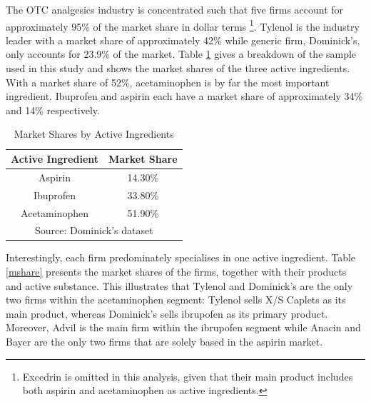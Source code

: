 \documentclass[12pt, authoryear]{elsarticle}
\begin{document}
The OTC analgesics industry is concentrated such that five firms account for approximately 95\% of the market share in dollar terms \footnote{Excedrin is omitted in this analysis, given that their main product includes both aspirin and
acetaminophen as active ingredients.}. Tylenol is the industry leader with a market share of approximately 42\% while generic firm, Dominick's, only accounts for 23.9\% of the market. Table \ref{active_share} gives a  breakdown of the sample used in this study and shows the market shares of the three active ingredients. With a market share of 52\%, acetaminophen is by far the most important ingredient. Ibuprofen and aspirin each have a market share of approximately 34\% and 14\% respectively.

\begin{table}[H]
	\caption{Market Shares by Active Ingredients}
	\label{active_share}
	\begin{tabular}{cc} \hline  \hline
		\textbf{Active Ingredient}  \cellcolor{gray!25} & \textbf{Market Share}  \cellcolor{gray!25} \\ \hline
		Aspirin & 14.30\% \\
		Ibuprofen & 33.80\% \\
		Acetaminophen & 51.90\% \\ \hline \hline
		\multicolumn{2}{c}{Source: Dominick's dataset}     
	\end{tabular}
\end{table}

Interestingly, each firm predominately specialises in one active ingredient. Table \ref{mshare}  presents the market shares of the firms, together with their products and active substance. This illustrates that Tylenol and Dominick's are the only two firms within the acetaminophen segment: Tylenol sells X/S Caplets as its main product, whereas Dominick's sells ibrupofen as its primary product. Moreover, Advil is the main firm within the ibrupofen segment while Anacin and Bayer are the only two firms that are solely based in the aspirin market. 
\end{document}
